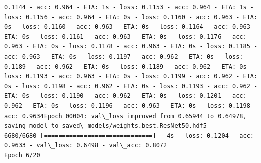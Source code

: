 \documentclass[11pt]{article}
\begin{document}
\begin{Verbatim}[commandchars=\\\{\}]
0.1144 - acc: 0.964 - ETA: 1s - loss: 0.1153 - acc: 0.964 - ETA: 1s - loss: 0.1156 - acc: 0.964 - ETA: 0s - loss: 0.1160 - acc: 0.963 - ETA: 0s - loss: 0.1160 - acc: 0.963 - ETA: 0s - loss: 0.1164 - acc: 0.963 - ETA: 0s - loss: 0.1161 - acc: 0.963 - ETA: 0s - loss: 0.1176 - acc: 0.963 - ETA: 0s - loss: 0.1178 - acc: 0.963 - ETA: 0s - loss: 0.1185 - acc: 0.963 - ETA: 0s - loss: 0.1197 - acc: 0.962 - ETA: 0s - loss: 0.1189 - acc: 0.962 - ETA: 0s - loss: 0.1189 - acc: 0.962 - ETA: 0s - loss: 0.1193 - acc: 0.963 - ETA: 0s - loss: 0.1199 - acc: 0.962 - ETA: 0s - loss: 0.1198 - acc: 0.962 - ETA: 0s - loss: 0.1193 - acc: 0.962 - ETA: 0s - loss: 0.1190 - acc: 0.962 - ETA: 0s - loss: 0.1201 - acc: 0.962 - ETA: 0s - loss: 0.1196 - acc: 0.963 - ETA: 0s - loss: 0.1198 - acc: 0.9634Epoch 00004: val\_loss improved from 0.65944 to 0.64978, saving model to saved\_models/weights.best.ResNet50.hdf5
6680/6680 [==============================] - 4s - loss: 0.1204 - acc: 0.9633 - val\_loss: 0.6498 - val\_acc: 0.8072
Epoch 6/20

\end{Verbatim}
\end{document}
